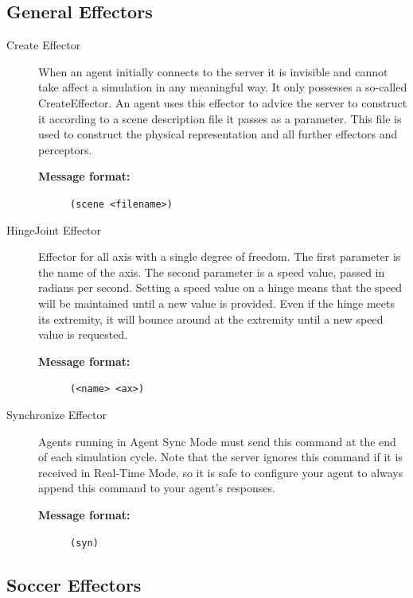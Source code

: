 \subsection{General Effectors}
\begin{description}


  \item [Create Effector]
  When an agent initially connects to the server it is invisible and cannot take affect a simulation in any meaningful way. It only possesses a so-called CreateEffector. An agent uses this effector to advice the server to construct it according to a scene description file it passes as a parameter. This file is used to construct the physical representation and all further effectors and perceptors.
  \begin{description}
  \item[{\bf Message format:}]
  \texttt{(scene <filename>)}
  \end{description}

  \item [HingeJoint Effector]
  Effector for all axis with a single degree of freedom. The first parameter is the name of the axis. The second parameter is a speed value, passed in radians per second. Setting a speed value on a hinge means that the speed will be maintained until a new value is provided. Even if the hinge meets its extremity, it will bounce around at the extremity until a new speed value is requested.
  \begin{description}
  \item[{\bf Message format:}]
  \texttt{(<name> <ax>)}
  \end{description}

  \item [Synchronize Effector]
  Agents running in Agent Sync Mode must send this command at the end of each simulation cycle. Note that the server ignores this command if it is received in Real-Time Mode, so it is safe to configure your agent to always append this command to your agent's responses.
  \begin{description}
  \item[{\bf Message format:}]
  \texttt{(syn)}
  \end{description}

\end{description}




\subsection{Soccer Effectors}



